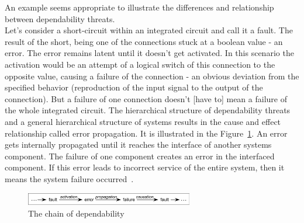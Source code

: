 \documentclass[]{myclass}
\begin{document}
An example seems appropriate to illustrate the differences and relationship between dependability threats. \\
Let's consider a short-circuit within an integrated circuit and call it a fault. The result of the short, being one of the connections stuck at a boolean value - an error. The error remains latent until it doesn't get activated. In this scenario the activation would be an attempt of a logical switch of this connection to the opposite value, causing a failure of the connection - an obvious deviation from the specified behavior (reproduction of the input signal to the output of the connection). But a failure of one connection doesn't [have to] mean a failure of the whole integrated circuit. The hierarchical structure of dependability threats and a general hierarchical structure of systems results in the cause and effect relationship called error propagation. It is illustrated in the {Figure~\ref*{fig:propagation}}. An error gets internally propagated until it reaches the interface of another systems component. The failure of one component creates an error in the interfaced component. If this error leads to incorrect service of the entire system, then it means the system failure occurred~\cite{art:Avizienis}. \\

\begin  {figure}  [H]
\centering
\includegraphics[width=0.65\textwidth]{figures/propagation.png}
\caption{The chain of dependability~\cite{art:Avizienis}}
\label{fig:propagation}
\end {figure}
\end{document}
